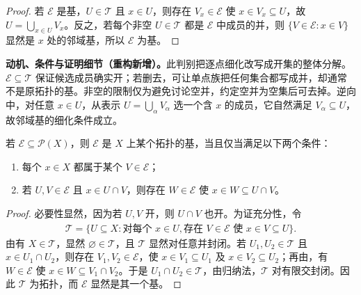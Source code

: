 \documentclass[../../main.tex]{subfiles}%
\begin{document}
\begin{proof}
若 $\mathcal E$ 是基，$U\in\mathcal T$ 且 $x\in U$，则存在 $V_x\in\mathcal E$ 使 $x\in V_x\subseteq U$，故 $U=\bigcup_{x\in U}V_x$。反之，若每个非空 $U\in\mathcal T$ 都是 $\mathcal E$ 中成员的并，则 $\{V\in\mathcal E:x\in V\}$ 显然是 $x$ 处的邻域基，所以 $\mathcal E$ 为基。
\end{proof}
\begin{remark}
\textbf{动机、条件与证明细节（重构新增）。}此判别把逐点细化改写成开集的整体分解。$\mathcal E\subseteq\mathcal T$ 保证候选成员确实开；若删去，可让单点族把任何集合都写成并，却通常不是原拓扑的基。非空的限制仅为避免讨论空并，约定空并为空集后可去掉。逆向中，对任意 $x\in U$，从表示 $U=\bigcup_\alpha V_\alpha$ 选一个含 $x$ 的成员，它自然满足 $V_\alpha\subseteq U$，故邻域基的细化条件成立。
\end{remark}
\begin{proposition}\label{proposition:ch04-base-criterion}
若 $\mathcal E\subseteq\mathscr P(X)$，则 $\mathcal E$ 是 $X$ 上某个拓扑的基，当且仅当满足以下两个条件：
\begin{enumerate}
\item\label{item:ch04-base-cover} 每个 $x\in X$ 都属于某个 $V\in\mathcal E$；
\item\label{item:ch04-base-intersection} 若 $U,V\in\mathcal E$ 且 $x\in U\cap V$，则存在 $W\in\mathcal E$ 使 $x\in W\subseteq U\cap V$。
\end{enumerate}
\end{proposition}
\begin{proof}
必要性显然，因为若 $U,V$ 开，则 $U\cap V$ 也开。为证充分性，令
\begin{align*}
\mathcal T=\{U\subseteq X:\text{对每个 }x\in U,\text{存在 }V\in\mathcal E\text{ 使 }x\in V\subseteq U\}.
\end{align*}
由有 $X\in\mathcal T$，显然 $\varnothing\in\mathcal T$，且 $\mathcal T$ 显然对任意并封闭。若 $U_1,U_2\in\mathcal T$ 且 $x\in U_1\cap U_2$，则存在 $V_1,V_2\in\mathcal E$，使 $x\in V_1\subseteq U_1$ 及 $x\in V_2\subseteq U_2$；再由，有 $W\in\mathcal E$ 使 $x\in W\subseteq V_1\cap V_2$。于是 $U_1\cap U_2\in\mathcal T$，由归纳法，$\mathcal T$ 对有限交封闭。因此 $\mathcal T$ 为拓扑，而 $\mathcal E$ 显然是其一个基。
\end{proof}
\end{document}
